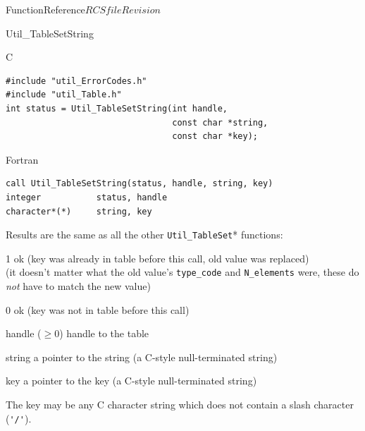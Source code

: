 \begin{cactuspart}{FunctionReference}{$RCSfile$}{$Revision$}
\begin{FunctionDescription}{Util\_TableSetString}
\begin{SynopsisSection}
\begin{Synopsis}{C}
\begin{verbatim}
#include "util_ErrorCodes.h"
#include "util_Table.h"
int status = Util_TableSetString(int handle,
                                 const char *string,
                                 const char *key);
\end{verbatim}
\end{Synopsis}
\begin{Synopsis}{Fortran}
\begin{verbatim}
call Util_TableSetString(status, handle, string, key)
integer           status, handle
character*(*)     string, key
\end{verbatim}
\end{Synopsis}
\end{SynopsisSection}

\begin{ResultSection}
\begin{ResultNote}
Results are the same as all the other \verb|Util_TableSet|* functions:
\end{ResultNote}
\begin{Result}{\rm 1}
ok (key was already in table before this call, old value was replaced)\\
   (it doesn't matter what the old value's \verb|type_code| and
    \verb|N_elements| were, \ie{} these do {\em not\/} have to match
    the new value)
\end{Result}
\begin{Result}{\rm 0}
ok (key was not in table before this call)
\end{Result}
\end{ResultSection}

\begin{ParameterSection}
\begin{Parameter}{handle ($\ge 0$)}
handle to the table
\end{Parameter}
\begin{Parameter}{string}
a pointer to the string (a C-style null-terminated string)
\end{Parameter}
\begin{Parameter}{key}
a pointer to the key (a C-style null-terminated string)
\end{Parameter}
\end{ParameterSection}

\begin{Discussion}
The key may be any C character string which does not contain a slash
character (\verb|'/'|).


\end{Discussion}
\end{FunctionDescription}
\end{cactuspart}
